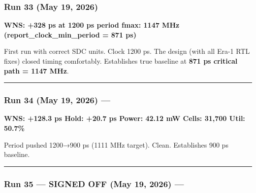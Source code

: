 \subsubsection{Run 33 (May 19, 2026)}\label{cr:run:asap7-cpu:run-33-may-19-2026}

\begin{record}

\textbf{WNS: +328 ps at 1200 ps period \textbar{} fmax: 1147 MHz
(report\_\allowbreak{}clock\_\allowbreak{}min\_\allowbreak{}period = 871
ps)}

First run with correct SDC units. Clock 1200 ps. The design (with all
Era-1 RTL fixes) closed timing comfortably. Establishes true baseline at
\textbf{871 ps critical path = 1147 MHz}.

\begin{center}\rule{0.5\linewidth}{0.5pt}\end{center}

\end{record}

\subsubsection{\texorpdfstring{Run 34 (May 19, 2026) ---
}{Run 34 (May 19, 2026) --- }}\label{cr:run:asap7-cpu:run-34-may-19-2026-run-2026-05-19-08-56-42}

\begin{record}

\textbf{WNS: +128.3 ps \textbar{} Hold: +20.7 ps \textbar{} Power: 42.12
mW \textbar{} Cells: 31,700 \textbar{} Util: 50.7\%}

Period pushed 1200→900 ps (1111 MHz target). Clean. Establishes 900 ps
baseline.

\begin{center}\rule{0.5\linewidth}{0.5pt}\end{center}

\end{record}

\subsubsection{\texorpdfstring{Run 35 --- SIGNED OFF \ok{} (May 19,
2026) ---
}{Run 35 --- SIGNED OFF  (May 19, 2026) --- }}\label{cr:run:asap7-cpu:run-35-signed-off-white-check-mark-may-19-2026-run-2026-05-19-10-47-29}

